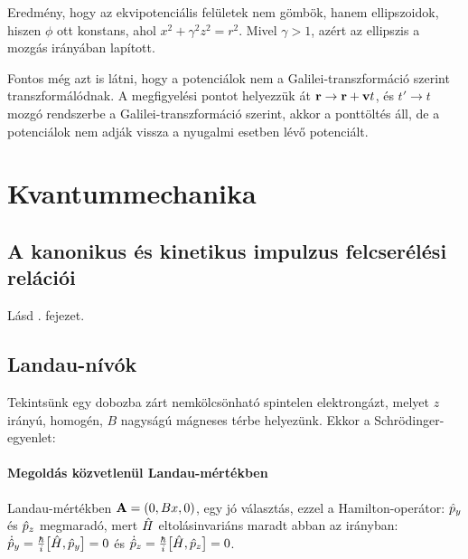    Eredmény, hogy az ekvipotenciális felületek nem gömbök, hanem ellipszoidok, hiszen $\phi$ ott konstans, ahol $x^2+\gamma^2z^2=r^2$. Mivel $\gamma>1$, azért az ellipszis a mozgás irányában lapított. 
   
   Fontos még azt is látni, hogy a potenciálok nem a Galilei-transzformáció szerint transzformálódnak. A megfigyelési pontot helyezzük át $\mathbf{r}\to\mathbf{r}+\mathbf{v} t$, és $t'\to t$ mozgó rendszerbe a Galilei-transzformáció szerint, akkor a ponttöltés áll, de a potenciálok nem adják vissza a nyugalmi esetben lévő potenciált.
   
   
 \section{Kvantummechanika}
  
  \subsection{A kanonikus és kinetikus impulzus felcserélési relációi}
   
   Lásd . fejezet.
   
  \subsection{Landau-nívók}
   
   Tekintsünk egy dobozba zárt nemkölcsönható spintelen elektrongázt, melyet $z$ irányú, homogén, $B$ nagyságú mágneses térbe helyezünk. Ekkor a Schrödinger-egyenlet:
   \paragraph{Megoldás közvetlenül Landau-mértékben}
    
    Landau-mértékben $\mathbf{A}=(0,Bx,0)$, egy jó választás, ezzel a Hamilton-operátor:
    $\hat{p}_y$ és $\hat{p}_z$ megmaradó, mert $\hat{H}$ eltolásinvariáns maradt abban az irányban: $\dot{\hat{p}}_y=\frac{\hbar}{i}\big[\hat{H},\hat{p}_y\big]=0$ és $\dot{\hat{p}}_z=\frac{\hbar}{i}\big[\hat{H},\hat{p}_z\big]=0$.
    
